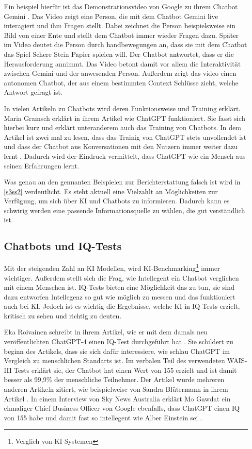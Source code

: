 	Ein beispiel hierfür ist das Demonstrationsvideo von Google zu ihrem Chatbot Gemini \cite{gminiDemo2023}. 
	Das Video zeigt eine Person, die mit dem Chatbot Gemini live interagiert und ihm Fragen stellt. Dabei
	zeichnet die Person beispielsweise ein Bild von einer Ente und stellt dem Chatbot immer wieder Fragen dazu.
	Später im Video deutet die Person durch handbewegungen an, dass sie mit dem Chatbot das Spiel \glqq{}Schere
	Stein Papier\grqq{} spielen will. Der Chatbot antwortet, dass er die Herausforderung annimmt. Das Video
	betont damit vor allem die Interaktivität zwischen Gemini und der anwesenden Person. Außerdem zeigt das
	video einen autonomen Chatbot, der aus einem bestimmten Context Schlüsse zieht, welche Antwort gefragt ist. 

	In vielen Artikeln zu Chatbots wird deren Funktionsweise und Training erklärt. Maria Gramsch erklärt in 
	ihrem Artikel wie ChatGPT funktioniert. Sie fasst sich hierbei kurz und erklärt unteranderem
	auch das Training von Chatbots. In dem Artikel ist zwei mal zu lesen, dass das Trainig von ChatGPT stets
	unvollendet ist und dass der Chatbot aus Konversationen mit den Nutzern immer weiter dazu lernt \cite{gramsch23}. 
	Dadurch wird der Eindruck vermittelt, dass ChatGPT wie ein Mensch aus seinen Erfahrungen lernt.

	Was genau an den gennanten Beispielen zur Berichterstattung falsch ist wird in \ref{s3ss2} verdeutlicht. 
	Es steht aktuell eine Vielzahlt an Möglichkeiten zur Verfügung, um sich über KI und Chatbots zu informieren. 
	Dadurch kann es schwirig werden eine passende Informationsquelle zu wählen, die gut verständlich ist.   	 	 
	
	\clearpage
	\subsection{Chatbots und IQ-Tests}\label{s1ss3}
	Mit der steigenden Zahl an KI Modellen, wird KI-Benchmarking\footnote{Verglich von KI-Systemen} immer wichtiger. 
	Außerdem stellt sich die Frag, wie Intellegent ein Chatbot verglichen mit einem Menschen ist. IQ-Tests 
	bieten eine Möglichkeit das zu tun, sie sind dazu entworfen Intellegenz so gut wie möglich zu messen und das 
	funktioniert auch bei KI. Jedoch ist es wichtig die Ergebnisse, welche KI in IQ-Tests erzielt, kritisch zu
	sehen und richtig zu deuten.

	Eka Roivainen schreibt in ihrem Artikel, wie er mit dem damals neu veröffentlichten ChatGPT-4 einen IQ-Test
	durchgeführt hat \cite{roivainen23}. Sie schildert zu beginn des Artikels, dass sie sich dafür interessiere, wie
	schlau ChatGPT im Vergleich zu menschlichen Standarts ist. Im verbalen Teil des verwendeten WAIS-III Tests
	erklärt sie, der Chatbot hat einen Wert von 155 erzielt und ist damit besser als 99,9\% der menschliche Teilnehmer.
	Der Artikel wurde mehreren anderen Artikeln zitiert, wie beispielweise von Sandra Blütermann in ihrem Artikel
	\cite{blutermann23}. In einem Interview von Sky News Australia erklärt Mo Gawdat ein ehmaliger Chief Business
	Officer von Google ebenfalls, dass ChatGPT einen IQ von 155 habe und damit fast so intellegent wie Alber Einstein
	sei \cite{gawdat23}.

